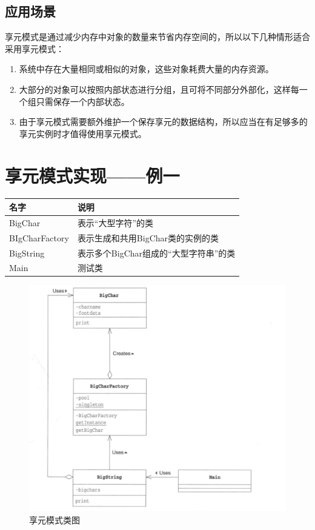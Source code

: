 \subsection{应用场景}
享元模式是通过减少内存中对象的数量来节省内存空间的，所以以下几种情形适合采用享元模式：
\begin{enumerate}
	\item 系统中存在大量相同或相似的对象，这些对象耗费大量的内存资源。
	\item 大部分的对象可以按照内部状态进行分组，且可将不同部分外部化，这样每一个组只需保存一个内部状态。
	\item 由于享元模式需要额外维护一个保存享元的数据结构，所以应当在有足够多的享元实例时才值得使用享元模式。
\end{enumerate}
\section{享元模式实现——例一}
\begin{table}[!h]
	\begin{tabular}{|l|l|}
		\hline
		名字&说明\\
		\hline
		BigChar&表示“大型字符”的类\\
		\hline
		BIgCharFactory&表示生成和共用BigChar类的实例的类\\
		\hline
		BigString&表示多个BigChar组成的“大型字符串”的类\\
		\hline
		Main&测试类\\
		\hline
	\end{tabular}
\end{table}
\begin{figure}[!h]
	\centering
	\includegraphics[width=\textwidth]{image/20-1}
	\caption{享元模式类图}
\end{figure}
